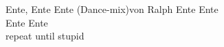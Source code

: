 
\begin{lied}{Ente, Ente Ente (Dance-mix)}{von Ralph}
Ente Ente\\
Ente Ente\\
repeat until stupid\\
\end{lied}
